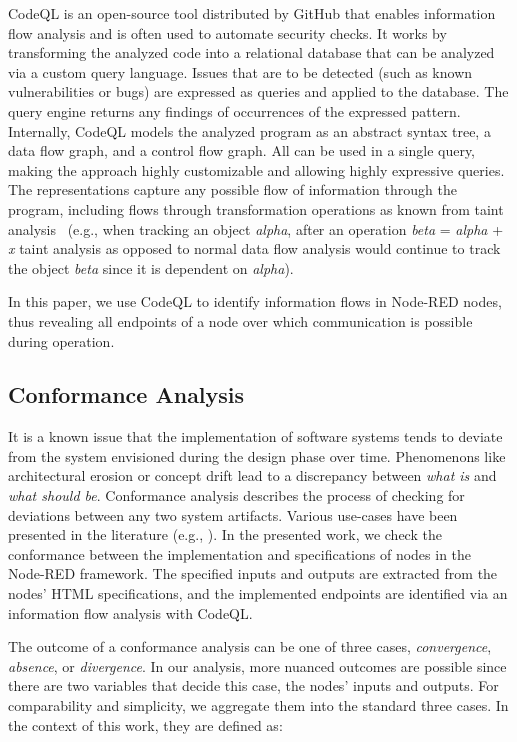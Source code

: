 CodeQL is an open-source tool distributed by GitHub that enables information flow analysis and is often used to automate security checks.
It works by transforming the analyzed code into a relational database that can be analyzed via a custom query language.
Issues that are to be detected (such as known vulnerabilities or bugs) are expressed as queries and applied to the database.
The query engine returns any findings of occurrences of the expressed pattern.
Internally, CodeQL models the analyzed program as an abstract syntax tree, a data flow graph, and a control flow graph.
All can be used in a single query, making the approach highly customizable and allowing highly expressive queries.
The representations capture any possible flow of information through the program, including flows through transformation operations as known from taint analysis~\cite{Schwartz10_taint_analysis_all_you_want_to_know} (e.g., when tracking an object \textit{alpha}, after an operation \textit{beta} = \textit{alpha} + \textit{x} taint analysis as opposed to normal data flow analysis would continue to track the object \textit{beta} since it is dependent on \textit{alpha}).

In this paper, we use CodeQL to identify information flows in Node-RED nodes, thus revealing all endpoints of a node over which communication is possible during operation.





\subsection{Conformance Analysis}
\label{sub:conformance_analysis}

It is a known issue that the implementation of software systems tends to deviate from the system envisioned during the design phase over time.
Phenomenons like architectural erosion or concept drift lead to a discrepancy between \textit{what is} and \textit{what should be}.
Conformance analysis describes the process of checking for deviations between any two system artifacts.
Various use-cases have been presented in the literature (e.g., \cite{Cao24_catma}).
In the presented work, we check the conformance between the implementation and specifications of nodes in the Node-RED framework.
The specified inputs and outputs are extracted from the nodes' HTML specifications, and the implemented endpoints are identified via an information flow analysis with CodeQL.

The outcome of a conformance analysis can be one of three cases, \textit{convergence}, \textit{absence}, or \textit{divergence}.
In our analysis, more nuanced outcomes are possible since there are two variables that decide this case, the nodes' inputs and outputs.
For comparability and simplicity, we aggregate them into the standard three cases.
In the context of this work, they are defined as:



